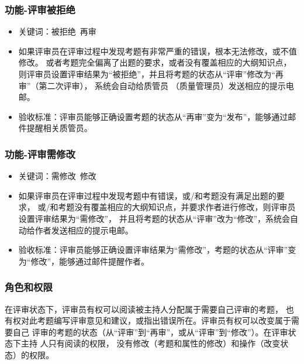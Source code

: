 \documentclass[hyperref, a4paper]{ctexart}
\providecommand{\tightlist}{%
  \setlength{\itemsep}{0pt}\setlength{\parskip}{0pt}}
\begin{document}
\hypertarget{ux529fux80fd-ux8bc4ux5ba1ux88abux62d2ux7edd}{%
\subsubsection{功能-评审被拒绝}\label{ux529fux80fd-ux8bc4ux5ba1ux88abux62d2ux7edd}}

\begin{itemize}
\tightlist
\item
  关键词：被拒绝~再审
\item
  如果评审员在评审过程中发现考题有非常严重的错误，根本无法修改，或不值修改。
  或者考题完全偏离了出题的要求，或者没有覆盖相应的大纲知识点，
  则评审员设置评审结果为``被拒绝''，并且将考题的状态从``评审''修改为``再审''（第二次评审），
  系统会自动给质管员 （质量管理员）发送相应的提示电邮。
\item
  验收标准：评审员能够正确设置考题的状态从``再审''变为``发布''，能够通过邮件提醒相关质管员。
\end{itemize}

\hypertarget{ux529fux80fd-ux8bc4ux5ba1ux9700ux4feeux6539}{%
\subsubsection{功能-评审需修改}\label{ux529fux80fd-ux8bc4ux5ba1ux9700ux4feeux6539}}

\begin{itemize}
\tightlist
\item
  关键词：需修改~修改
\item
  如果评审员在评审过程中发现考题中有错误，或/和考题没有满足出题的要求，
  或/和考题没有覆盖相应的大纲知识点，并要求作者进行修改，则评审员设置评审结果为``需修改''，
  并且将考题的状态从``评审''改为``修改''，系统会自动给作者发送相应的提示电邮。
\item
  验收标准：评审员能够正确设置评审结果为``需修改''，考题的状态从``评审''变为``修改''，能够通过邮件提醒作者。
\end{itemize}

\hypertarget{ux89d2ux8272ux548cux6743ux9650}{%
\subsubsection{角色和权限}\label{ux89d2ux8272ux548cux6743ux9650}}

在评审状态下，评审员有权可以阅读被主持人分配属于需要自己评审的考题，
也有权对此考题编写评审意见和建议，或指出错误所在。评审员有权可以改变属于需要自己
评审的考题的状态（从``评审''到``再审''，或从``评审''到``修改''）。在评审状态下主持
人只有阅读的权限，
没有修改（考题和属性的修改）和操作（改变状态）的权限。
\end{document}
